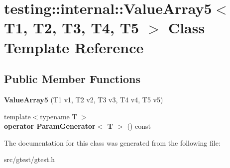 \hypertarget{classtesting_1_1internal_1_1_value_array5}{}\section{testing\+:\+:internal\+:\+:Value\+Array5$<$ T1, T2, T3, T4, T5 $>$ Class Template Reference}
\label{classtesting_1_1internal_1_1_value_array5}
\subsection*{Public Member Functions}
\begin{DoxyCompactItemize}
\item 
\mbox{\label{classtesting_1_1internal_1_1_value_array5_a9c5687fd18da21263aebc21b9ea508b8}} 
{\bfseries Value\+Array5} (T1 v1, T2 v2, T3 v3, T4 v4, T5 v5)
\item 
\mbox{\label{classtesting_1_1internal_1_1_value_array5_ab925a168d89be9964c4319e5212222c1}} 
{\footnotesize template$<$typename T $>$ }\\{\bfseries operator Param\+Generator$<$ T $>$} () const
\end{DoxyCompactItemize}


The documentation for this class was generated from the following file\+:\begin{DoxyCompactItemize}
\item 
src/gtest/gtest.\+h\end{DoxyCompactItemize}
